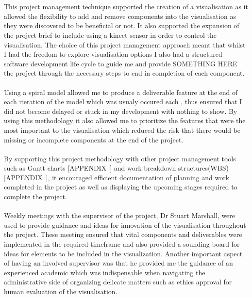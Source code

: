 \\\\
This project management technique supported the creation of a visualisation as it allowed the flexibility to add and remove components into the visualisation as they were discovered to be beneficial or not. It also supported the expansion of the project brief to include using a kinect sensor in order to control the visualisation. The choice of this project management approach meant that whilst I had the freedom to explore visualisation options I also had a structured software development life cycle to guide me and provide SOMETHING HERE~ the project through the necessary steps to end in completion of each component.
\\\\
Using a spiral model allowed me to produce a deliverable feature at the end of each iteration of the model which was usualy occured each , thus ensured that I did not become delayed or stuck in my development with nothing to show. By using this methodology it also allowed me to prioritize the features that were the most important to the visualisation which reduced the risk that there would be missing or incomplete components at the end of the project. 
\\\\

By supporting this project methodology with other project management tools such as Gantt charts [APPENDIX~] and work breakdown structures(WBS) [APPENDIX~], it encouraged efficient documentation of planning and work completed in the project as well as displaying the upcoming stages required to complete the project.
\\\\
Weekly meetings with the supervisor of the project, Dr Stuart Marshall, were used to provide guidance and ideas for innovation of the visualisation throughout the project. These meeting ensured that vital components and deliverables were implemented in the required timeframe and also provided a sounding board for ideas for elements to be included in the visualization. Another important aspect of having an involved supervisor was that he provided me the guidance of an experienced academic which was indispensable when navigating the administrative side of organizing delicate matters such as ethics approval for human evaluation of the visualisation.


